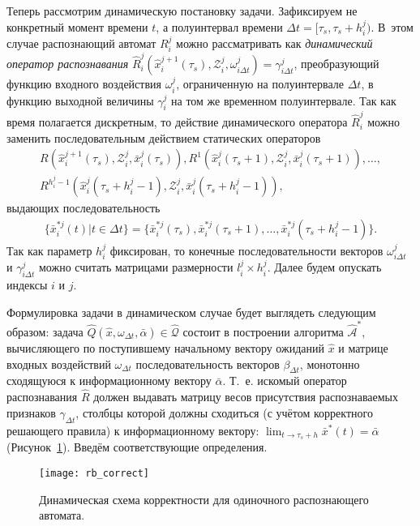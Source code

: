 Теперь рассмотрим динамическую постановку задачи. Зафиксируем не конкретный момент времени $t$, а полуинтервал времени ${\Delta}t=[\tau_s,\tau_s+h_i^j)$. В~этом случае распознающий автомат $R_i^j$ можно рассматривать как \textit{динамический оператор распознавания} $\hat{R}_i^j(\hat{x}_i^{j+1}(\tau_s), \mathcal{Z}_i^j, \omega_{i\Delta{t}}^j)=\gamma_{i\Delta{t}}^j$, преобразующий  функцию входного воздействия $\omega_i^j$, ограниченную на полуинтервале ${\Delta}t$, в функцию выходной величины $\gamma_i^j$ на том же временном полуинтервале. Так как время полагается дискретным, то действие динамического оператора $\hat{R}_i^j$ можно заменить последовательным действием статических операторов 
\begin{eqnarray}
	R(\hat{x}_i^{j+1}(\tau_s), \mathcal{Z}_i^j, \bar{x}_i^j(\tau_s)), R^1(\hat{x}_i^j(\tau_s+1), \mathcal{Z}_i^j, \bar{x}_i^j(\tau_s+1)), \dots,\nonumber\\
	R^{h_i^j-1}(\hat{x}_i^j(\tau_s+h_i^j-1), \mathcal{Z}_i^j, \bar{x}_i^j(\tau_s+h_i^j-1)),
\end{eqnarray}
выдающих последовательность 
\begin{eqnarray}
	\{\bar{x}_i^{*j}(t)|t\in\Delta t\}=\{\bar{x}_i^{*j}(\tau_s), \bar{x}_i^{*j}(\tau_s+1), \dots, \bar{x}_i^{*j}(\tau_s+h_i^j-1)\}.
\end{eqnarray}
Так как параметр $h_i^j$ фиксирован, то конечные последовательности векторов  $\omega_{i\Delta{t}}^j$ и $\gamma_{i\Delta{t}}^j$ можно считать матрицами размерности $l_i^j\times{h_i^j}$. Далее будем опускать индексы $i$ и $j$.
	
Формулировка задачи в динамическом случае будет выглядеть следующим образом: задача $\hat{Q}(\hat{x}, \omega_{{\Delta}t}, \bar{\alpha})\in\hat{\mathcal Q}$ состоит в построении алгоритма $\hat{\mathcal A}^*$, вычисляющего по поступившему начальному вектору ожиданий $\hat{x}$ и матрице входных воздействий $\omega_{{\Delta}t}$  последовательность векторов $\beta_{\Delta{t}}$, монотонно сходящуюся к информационному вектору $\bar{\alpha}$. Т.~е. искомый оператор распознавания $\hat{R}$ должен выдавать матрицу весов присутствия распознаваемых признаков $\gamma_{\Delta{t}}$, столбцы которой должны сходиться (с учётом корректного решающего правила) к информационному вектору: $\lim_{t\to\tau_s+h}\bar{x}^*(t)=\bar{\alpha}$ (Рисунок~\ref{fig:rb_correct_dyn}). Введём соответствующие определения.
	
\begin{figure}[h]
	\centering
	\texttt{[image: rb\_correct]}
	\caption{Динамическая схема корректности для одиночного распознающего автомата.}
	\label{fig:rb_correct_dyn}
\end{figure}
	
